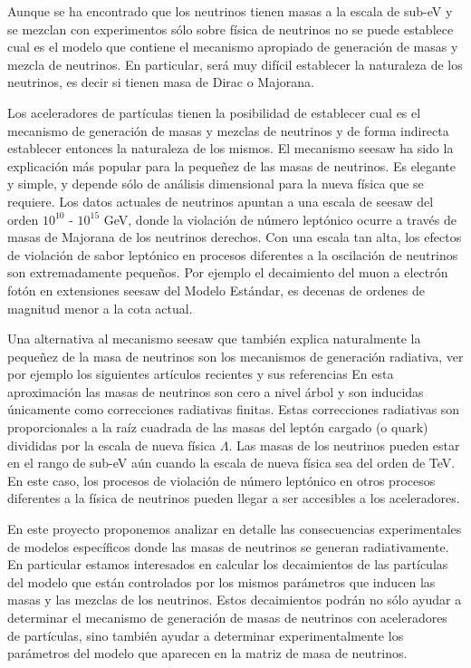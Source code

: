 Aunque se ha encontrado que los neutrinos tienen masas a la escala de
sub-eV y se mezclan %
con experimentos sólo sobre
física de neutrinos no se puede establece cual es el modelo que contiene
el mecanismo apropiado de generación de masas y mezcla de neutrinos.
En particular, será muy difícil establecer la naturaleza de los
neutrinos, es decir si tienen masa de Dirac o Majorana.

Los aceleradores de partículas tienen la posibilidad de
establecer cual es el mecanismo de generación de masas y mezclas de
neutrinos y de forma indirecta establecer entonces la naturaleza de
los mismos. El mecanismo seesaw %
ha sido la
explicación más popular para la pequeñez de las masas de neutrinos. Es
elegante y simple, y depende sólo de análisis dimensional para la
nueva física que se requiere. Los datos actuales de neutrinos
apuntan a una escala de seesaw del orden $10^{10}$ - $10^{15}$ GeV,
donde la violación de número leptónico ocurre a través de masas de
Majorana de los neutrinos derechos. Con una escala tan alta, los
efectos de violación de sabor leptónico en procesos diferentes a la
oscilación de neutrinos son extremadamente pequeños. Por ejemplo el
decaimiento del muon a electrón fotón en extensiones seesaw del Modelo
Estándar, es decenas de ordenes de magnitud menor a la cota actual.

Una alternativa al mecanismo seesaw que también explica naturalmente
la pequeñez de la masa de neutrinos son los mecanismos de generación
radiativa, ver por ejemplo los siguientes artículos recientes y
sus referencias
En esta aproximación las masas de neutrinos son cero a nivel árbol y
son inducidas únicamente como correcciones radiativas finitas.  Estas
correcciones radiativas son proporcionales a la raíz cuadrada de
las masas del leptón cargado (o quark) divididas por la escala de nueva
física $\Lambda$. Las masas de los neutrinos pueden estar en el rango
de sub-eV aún cuando la escala de nueva física sea del orden de
TeV. En este caso, los procesos de violación de número leptónico en
otros procesos diferentes a la física de neutrinos pueden llegar
a ser accesibles a los aceleradores.

En este proyecto proponemos analizar en detalle las consecuencias
experimentales de modelos específicos donde las masas de
neutrinos se generan radiativamente. En particular estamos interesados
en calcular los decaimientos de las partículas del modelo que
están controlados por los mismos parámetros que inducen las masas y
las mezclas de los neutrinos. Estos decaimientos podrán no sólo
ayudar a determinar el mecanismo de generación de masas de neutrinos
con aceleradores de partículas, sino también ayudar a determinar
experimentalmente los parámetros del modelo que aparecen en la matriz
de masa de neutrinos.

